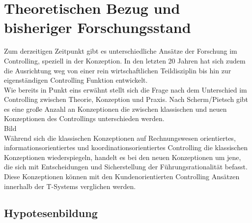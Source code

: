 
\chapter{Theoretischen Bezug und bisheriger Forschungsstand }
\label{ch:Bezug}


Zum derzeitigen Zeitpunkt gibt es unterschiedliche Ansätze der Forschung im Controlling, speziell in der Konzeption. In den letzten 20 Jahren hat sich zudem die Ausrichtung weg von einer rein wirtschaftlichen Teildisziplin bis hin zur eigenständigen Controlling Funktion entwickelt.
\\
Wie bereits in Punkt eins erwähnt stellt sich die Frage nach dem Unterschied im Controlling zwischen Theorie, Konzeption und Praxis. Nach Scherm/Pietsch gibt es eine große Anzahl an Konzeptionen die zwischen klassischen und neuen Konzeptionen des Controllings unterschieden werden.
\\
Bild
\\
Während sich die klassischen Konzeptionen auf Rechnungswesen orientiertes, informationsorientiertes und koordinationsorientiertes Controlling die klassischen Konzeptionen wiederspiegeln, handelt es bei den neuen Konzeptionen um jene, die sich mit Entscheidungen und Sicherstellung der Führungsrationalität befasst.
\\
Diese Konzeptionen können mit den Kundenorientierten Controlling Ansätzen innerhalb der T-Systems verglichen werden.


\section{Hypotesenbildung}
\label{ch:ITIL:sec:ITIL11:sec:Hypothesenbildung}

